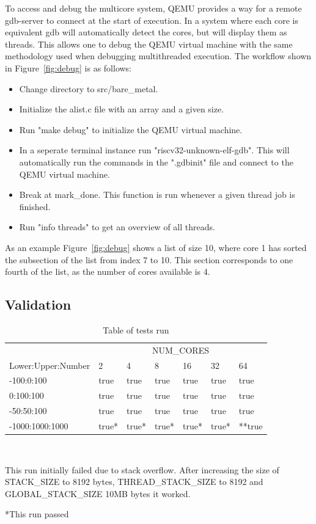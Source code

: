 To access and debug the multicore system, QEMU provides a way for a remote
gdb-server to connect at the start of execution.\cite{QEMU} In a system where
each core is equivalent gdb will automatically detect the cores, but will
display them as threads. This allows one to debug the QEMU virtual machine with
the same methodology used when debugging multithreaded execution. The workflow shown in Figure~\ref{fig:debug} is as follows:
\begin{itemize}
  \item Change directory to src/bare\_metal.
  \item Initialize the alist.c file with an array and a given size.
  \item Run "make debug" to initialize the QEMU virtual machine.
  \item In a seperate terminal instance run "riscv32-unknown-elf-gdb". This will
    automatically run the commands in the ".gdbinit" file and connect to the
    QEMU virtual machine.
  \item Break at mark\_done. This function is run whenever a given thread job is
    finished.
  \item Run "info threads" to get an overview of all threads.
\end{itemize}
As an example Figure~\ref{fig:debug} shows a list of size 10, where core 1 has
sorted the subsection of the list from index 7 to 10. This section corresponds
to one fourth of the list, as the number of cores available is 4.

\subsection{Validation}\label{sec:validate}
\begin{table}
  \caption{Table of tests run}\label{tab:tests}
  \begin{center}
    \begin{tabular}[c]{l|l|l|l|l|l|l}
      & \multicolumn{6}{c}{NUM\_CORES}\\
      \cline{2-7}
      Lower:Upper:Number & 2 & 4 & 8 & 16 & 32 & 64\\
      \hline
      -100:0:100 & true & true & true & true & true & true \\
      \hline
      0:100:100 & true & true & true & true & true & true\\
      \hline
      -50:50:100 & true & true & true & true & true & true \\
      \hline
      -1000:1000:1000 & true* & true* & true* & true* & true* & **true
    \end{tabular} \\
    \vspace{1em}
    \raggedright{\footnotesize *This run initially failed due to stack overflow. After
    increasing the size of STACK\_SIZE to 8192 bytes, THREAD\_STACK\_SIZE to
  8192 and GLOBAL\_STACK\_SIZE 10MB bytes it worked.} \\
    \raggedright{\footnotesize **This run passed }
  \end{center}
\end{table}


